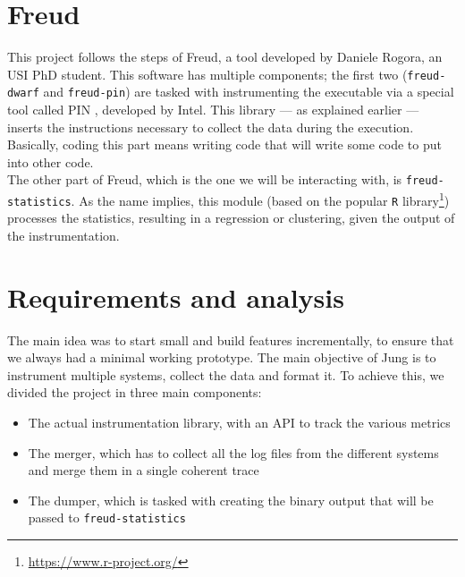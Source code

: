     \section{Freud}\label{sec:freud}


        This project follows the steps of Freud, a tool developed by Daniele Rogora, an USI PhD student.
        This software has multiple components; the first two (\texttt{freud-dwarf} and \texttt{freud-pin})
        are tasked with instrumenting the executable 
        via a special tool called PIN \cite{PIN}, developed by Intel. This library --- as explained earlier --- 
        inserts the instructions necessary to collect the data during the execution. Basically, coding this
        part means writing code that will write some code to put into other code.\\

        The other part of Freud, which is the one we will be interacting with, is \texttt{freud-statistics}.
        As the name implies, this module (based on the popular \texttt{R} library\footnote{\url{https://www.r-project.org/}})
        processes the statistics, resulting in a regression or clustering, given the output of the instrumentation.


    \section{Requirements and analysis}\label{sec:requirements}


        The main idea was to start small and build features incrementally, to ensure that we always
        had a minimal working prototype.  The main objective of
        Jung is to instrument multiple systems, collect the data and format it.
        To achieve this, we divided the project in three main components:

        \begin{itemize}
            \item The actual instrumentation library, with an API to track the various metrics
            \item The merger, which has to collect all the log files from the different systems
             and merge them in a single coherent trace
            \item The dumper, which is tasked with creating the binary output that will be passed
             to \texttt{freud-statistics}
        \end{itemize}

